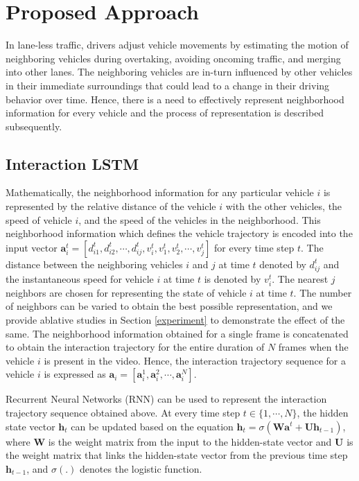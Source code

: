 \documentclass[final,journal]{IEEEtran}
\begin{document}
\section{Proposed Approach}\label{proposed}
In lane-less traffic, drivers adjust vehicle movements by estimating the motion of neighboring vehicles during overtaking, avoiding oncoming traffic, and merging into other lanes. The neighboring vehicles are in-turn influenced by other vehicles in their immediate surroundings that could lead to a change in their driving behavior over time. Hence, there is a need to effectively represent neighborhood information for every vehicle and the process of representation is described subsequently.

\subsection{Interaction LSTM}
Mathematically, the neighborhood information for any particular vehicle $i$ is represented by the relative distance of the vehicle $i$ with the other vehicles, the speed of vehicle $i$, and the speed of the vehicles in the neighborhood. This neighborhood information which defines the vehicle trajectory is encoded into the input vector $\mathbf{a}^t_i = [d^t_{i1}, d^t_{i2}, \cdots, d^t_{ij}, v^t_i, v^t_1, v^t_2, \cdots, v^t_j]$ for every time step $t$. The distance between the neighboring vehicles $i$ and $j$ at time $t$ denoted by $d^t_{ij}$ and the instantaneous speed for vehicle $i$ at time $t$ is denoted by $v^t_i$. The nearest $j$ neighbors are chosen for representing the state of vehicle $i$ at time $t$. The number of neighbors can be varied to obtain the best possible representation, and we provide ablative studies in Section \ref{experiment} to demonstrate the effect of the same. The neighborhood information obtained for a single frame is concatenated to obtain the interaction trajectory for the entire duration of $N$ frames when the vehicle $i$ is present in the video. Hence, the interaction trajectory sequence for a vehicle $i$ is expressed as $\mathbf{a}_i = [\mathbf{a}^1_i, \mathbf{a}^2_i, \cdots, \mathbf{a}^N_i]$.

Recurrent Neural Networks (RNN) \cite{rnn} can be used to represent the interaction trajectory sequence obtained above. At every time step $t \in \{1, \cdots, N\}$, the hidden state vector $\mathbf{h}_t$ can be updated based on the equation $\mathbf{h}_t = \sigma\left(\mathbf{W}\mathbf{a}^t + \mathbf{U}\mathbf{h}_{t-1}\right)$, where $\mathbf{W}$ is the weight matrix from the input to the hidden-state vector and $\mathbf{U}$ is the weight matrix that links the hidden-state vector from the previous time step $\mathbf{h}_{t-1}$, and $\sigma(.)$ denotes the logistic function.
\end{document}
